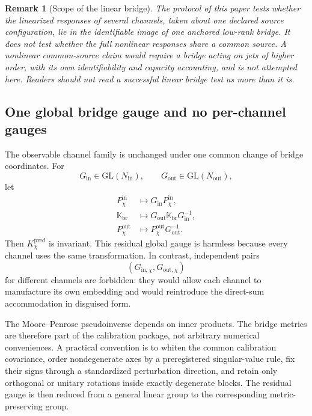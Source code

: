 \documentclass[11pt]{article}
\newtheorem{remark}{Remark}
\begin{document}
\begin{remark}[Scope of the linear bridge]
\label{rem:linear_scope}
The protocol of this paper tests whether the \emph{linearized} responses of several channels, taken about one declared source configuration, lie in the identifiable image of one anchored low-rank bridge. It does not test whether the full nonlinear responses share a common source. A nonlinear common-source claim would require a bridge acting on jets of higher order, with its own identifiability and capacity accounting, and is not attempted here. Readers should not read a successful linear bridge test as more than it is.
\end{remark}

\subsection{One global bridge gauge and no per-channel gauges}

The observable channel family is unchanged under one common change of bridge coordinates. For
\begin{equation}
G_{\mathrm{in}}\in\mathrm{GL}(N_{\mathrm{in}}),
\qquad
G_{\mathrm{out}}\in\mathrm{GL}(N_{\mathrm{out}}),
\end{equation}
let
\begin{align}
P_{\chi}^{\mathrm{in}}&\longmapsto G_{\mathrm{in}}P_{\chi}^{\mathrm{in}},\\
\mathbb K_{\mathrm{br}}&\longmapsto
G_{\mathrm{out}}\mathbb K_{\mathrm{br}}G_{\mathrm{in}}^{-1},\\
P_{\chi}^{\mathrm{out}}&\longmapsto
P_{\chi}^{\mathrm{out}}G_{\mathrm{out}}^{-1}.
\label{eq:global_gauge}
\end{align}
Then \(K_{\chi}^{\mathrm{pred}}\) is invariant. This residual global gauge is harmless because every channel uses the same transformation. In contrast, independent pairs
\begin{equation}
(G_{\mathrm{in},\chi},G_{\mathrm{out},\chi})
\end{equation}
for different channels are forbidden: they would allow each channel to manufacture its own embedding and would reintroduce the direct-sum accommodation in disguised form.

The Moore--Penrose pseudoinverse depends on inner products. The bridge metrics are therefore part of the calibration package, not arbitrary numerical conveniences. A practical convention is to whiten the common calibration covariance, order nondegenerate axes by a preregistered singular-value rule, fix their signs through a standardized perturbation direction, and retain only orthogonal or unitary rotations inside exactly degenerate blocks. The residual gauge is then reduced from a general linear group to the corresponding metric-preserving group.
\end{document}
